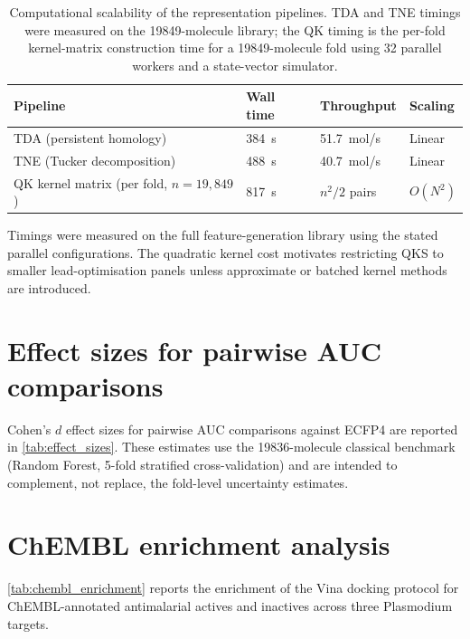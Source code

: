 \documentclass[11pt,a4paper]{article}
\begin{document}
\begin{table}[htbp]
\centering
\caption{Computational scalability of the representation pipelines. TDA and TNE timings were measured on the \num{19849}-molecule library; the QK timing is the per-fold kernel-matrix construction time for a \num{19849}-molecule fold using 32 parallel workers and a state-vector simulator.}
\label{tab:scalability}
\begin{tabularx}{\textwidth}{l l l l}
\toprule
Pipeline & {Wall time} & {Throughput} & {Scaling} \\
\midrule
TDA (persistent homology) & \SI{384}{\second} & 51.7~mol/s & Linear \\
TNE (Tucker decomposition) & \SI{488}{\second} & 40.7~mol/s & Linear \\
QK kernel matrix (per fold, $n=19{,}849$) & \SI{817}{\second} & $n^2/2$ pairs & $O(N^2)$ \\
\bottomrule
\end{tabularx}
\vspace{1mm}
\footnotesize Timings were measured on the full feature-generation library using the stated parallel configurations. The quadratic kernel cost motivates restricting QKS to smaller lead-optimisation panels unless approximate or batched kernel methods are introduced.
\end{table}


\section{Effect sizes for pairwise AUC comparisons}
\label{sec:effect_sizes}

Cohen's $d$ effect sizes for pairwise AUC comparisons against ECFP4 are reported in \cref{tab:effect_sizes}. These estimates use the \num{19836}-molecule classical benchmark (Random Forest, 5-fold stratified cross-validation) and are intended to complement, not replace, the fold-level uncertainty estimates.





\section{ChEMBL enrichment analysis}
\label{sec:chembl_enrichment}

\cref{tab:chembl_enrichment} reports the enrichment of the Vina docking protocol for ChEMBL-annotated antimalarial actives and inactives across three Plasmodium targets.
\end{document}
